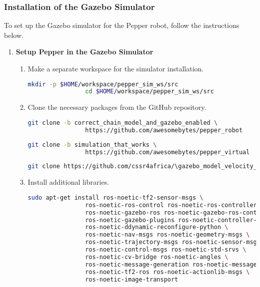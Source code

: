 \documentclass{CSSRforAfrica}
\begin{document}
{		\subsubsection*{Installation of the Gazebo Simulator}
		To set up the Gazebo simulator for the Pepper robot, follow the instructions below.
		
		\begin{enumerate}
			\item \textbf{Setup Pepper in the Gazebo Simulator}
			\begin{enumerate}
				\item Make a separate workspace for the simulator installation.
				\begin{lstlisting}[style=withoutNumbering, language=bash]
				mkdir -p $HOME/workspace/pepper_sim_ws/src
				cd $HOME/workspace/pepper_sim_ws/src
				\end{lstlisting} 
				
				\item Clone the necessary packages from the GitHub repository.
				\begin{lstlisting}[style=withoutNumbering, language=bash]
				git clone -b correct_chain_model_and_gazebo_enabled \
				https://github.com/awesomebytes/pepper_robot
				\end{lstlisting} 
				
				\begin{lstlisting}[style=withoutNumbering, language=bash]
				git clone -b simulation_that_works \
				https://github.com/awesomebytes/pepper_virtual
				\end{lstlisting} 
				
				\begin{lstlisting}[style=withoutNumbering, language=bash]
				git clone https://github.com/cssr4africa/\gazebo_model_velocity_plugin
				\end{lstlisting} 
				
				\item Install additional libraries.
				\begin{lstlisting}[style=withoutNumbering, language=bash]
				sudo apt-get install ros-noetic-tf2-sensor-msgs \
				ros-noetic-ros-control ros-noetic-ros-controllers \
				ros-noetic-gazebo-ros ros-noetic-gazebo-ros-control \
				ros-noetic-gazebo-plugins ros-noetic-controller-manager \
				ros-noetic-ddynamic-reconfigure-python \
				ros-noetic-nav-msgs ros-noetic-geometry-msgs \
				ros-noetic-trajectory-msgs ros-noetic-sensor-msgs \
				ros-noetic-control-msgs ros-noetic-std-srvs \
				ros-noetic-cv-bridge ros-noetic-angles \
				ros-noetic-message-generation ros-noetic-message-runtime \
				ros-noetic-tf2-ros ros-noetic-actionlib-msgs \
				ros-noetic-image-transport
				\end{lstlisting}
				

\end{enumerate}
\end{enumerate}}
\end{document}
